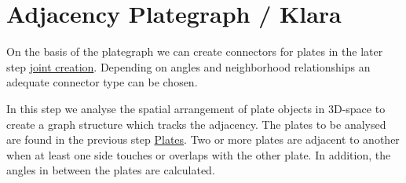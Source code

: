 \documentclass[../ClassicThesis.tex]{subfiles}
\begin{document}
\chapter{Adjacency Plategraph / Klara}\label{ch:graph}
\newcommand{\TODO}[1]{\textcolor{red}{\\ \textbf{TODO:} #1 \\}}





On the basis of the plategraph we can create connectors for plates in the later step \hyperref[ch:joints]{joint creation}. Depending on angles and neighborhood relationships an adequate connector type can be chosen.

In this step we analyse the spatial arrangement of plate objects in 3D-space to create a graph structure which tracks the adjacency. The plates to be analysed are found in the previous step \hyperref[ch:plates]{Plates}. Two or more plates are adjacent to another when at least one side touches or overlaps with the other plate. In addition, the angles in between the plates are calculated. 


\end{document}
